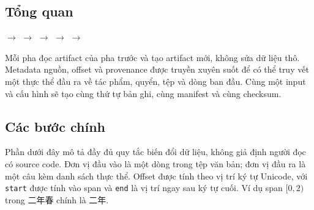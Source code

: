 \documentclass[11pt,a4paper]{article}
\newcommand{\han}[1]{{\hanfont #1}}
\begin{document}
\subsection{Tổng quan}

\begin{center}
\small
{} $\rightarrow$
 $\rightarrow$
 $\rightarrow$
 $\rightarrow$
 $\rightarrow$
\end{center}

Mỗi pha đọc artifact của pha trước và tạo artifact mới, không sửa dữ liệu thô.
Metadata nguồn, offset và provenance được truyền xuyên suốt để có thể truy vết
một thực thể đầu ra về tác phẩm, quyển, tệp và dòng ban đầu. Cùng một input và
cấu hình sẽ tạo cùng thứ tự bản ghi, cùng manifest và cùng checksum.

\subsection{Các bước chính}

Phần dưới đây mô tả đầy đủ quy tắc biến đổi dữ liệu, không giả định người đọc
có source code. Đơn vị đầu vào là một dòng trong tệp văn bản; đơn vị đầu ra là
một câu kèm danh sách thực thể. Offset được tính theo vị trí ký tự Unicode, với
\texttt{start} được tính vào span và \texttt{end} là vị trí ngay sau ký tự cuối.
Ví dụ span $[0,2)$ trong \han{二年春} chính là \han{二年}.
\end{document}
